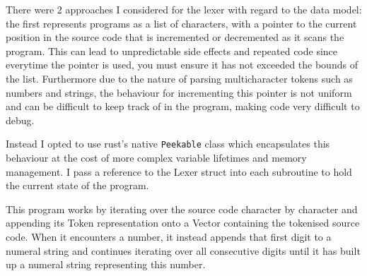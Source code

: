There were 2 approaches I considered for the lexer with regard to the data model: the first represents programs as a list of characters, with a pointer to the current position in the source code that is incremented or decremented as it scans the program. This can lead to unpredictable side effects and repeated code since everytime the pointer is used, you must ensure it has not exceeded the bounds of the list. Furthermore due to the nature of parsing multicharacter tokens such as numbers and strings, the behaviour for incrementing this pointer is not uniform and can be difficult to keep track of in the program, making code very difficult to debug. 

Instead I opted to use rust's native \texttt{Peekable} class which encapsulates this behaviour at the cost of more complex variable lifetimes and memory management. I pass a reference to the Lexer struct into each subroutine to hold the current state of the program.

This program works by iterating over the source code character by character and appending its Token representation onto a Vector containing the tokenised source code. When it encounters a number, it instead appends that first digit to a numeral string and continues iterating over all consecutive digits until it has built up a numeral string representing this number. 

